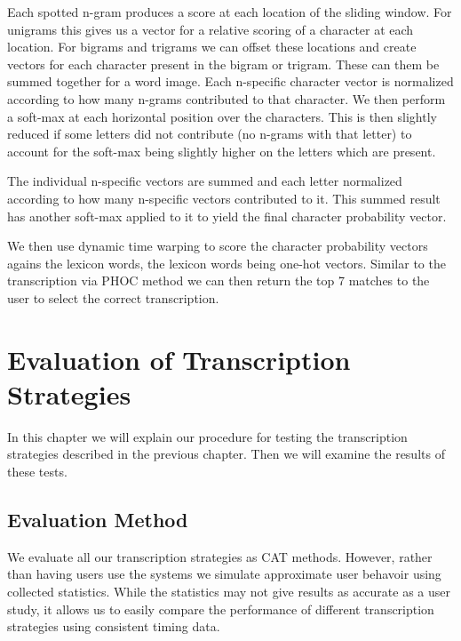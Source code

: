 \documentclass[ms,electronic,twosidetoc,letterpaper,chaptercenter,parttop,lol,lof,lot]{byumsphd}
\begin{document}
Each spotted n-gram produces a score at each location of the sliding window. For unigrams this gives us a vector for a relative scoring of a character at each location. For bigrams and trigrams we can offset these locations and create vectors for each character present in the bigram or trigram. These can them be summed together for a word image.
Each n-specific character vector is normalized according to how many n-grams contributed to that character.
We then perform a soft-max at each horizontal position over the characters. This is then slightly reduced if some letters did not contribute (no n-grams with that letter) to account for the soft-max being slightly higher on the letters which are present.

The individual n-specific vectors are summed and each letter normalized according to how many n-specific vectors contributed to it.
This summed result has another soft-max applied to it to yield the final character probability vector.

We then use dynamic time warping to score the character probability vectors agains the lexicon words, the lexicon words being one-hot vectors. Similar to the transcription via PHOC method we can then return the top 7 matches to the user to select the correct transcription.




\chapter{Evaluation of Transcription Strategies}

In this chapter we will explain our procedure for testing the transcription strategies described in the previous chapter. Then we will examine the results of these tests.

\section{Evaluation Method}

We evaluate all our transcription strategies as CAT methods. However, rather than having users use the systems we simulate approximate user behavoir using collected statistics. While the statistics may not give results as accurate as a user study, it allows us to easily compare the performance of different transcription strategies using consistent timing data.
\end{document}

